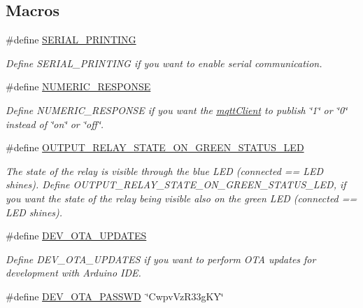 \subsection*{Macros}
\begin{DoxyCompactItemize}
\item 
\#define \hyperlink{WIFIOnOff_8ino_a111429b8fcdec5c5148837425261c18f}{S\-E\-R\-I\-A\-L\-\_\-\-P\-R\-I\-N\-T\-I\-N\-G}
\begin{DoxyCompactList}\small\item\em Define S\-E\-R\-I\-A\-L\-\_\-\-P\-R\-I\-N\-T\-I\-N\-G if you want to enable serial communication. \end{DoxyCompactList}\item 
\#define \hyperlink{WIFIOnOff_8ino_a59912dabf54ca43542cdc292e80d5742}{N\-U\-M\-E\-R\-I\-C\-\_\-\-R\-E\-S\-P\-O\-N\-S\-E}
\begin{DoxyCompactList}\small\item\em Define N\-U\-M\-E\-R\-I\-C\-\_\-\-R\-E\-S\-P\-O\-N\-S\-E if you want the \hyperlink{WIFIOnOff_8ino_a0524591f2a058a4f26f16579245db356}{mqtt\-Client} to publish \char`\"{}1\char`\"{} or \char`\"{}0\char`\"{} instead of \char`\"{}on\char`\"{} or \char`\"{}off\char`\"{}. \end{DoxyCompactList}\item 
\#define \hyperlink{WIFIOnOff_8ino_a05aa5fbe8a67eecb3e1d318cc590b4f9}{O\-U\-T\-P\-U\-T\-\_\-\-R\-E\-L\-A\-Y\-\_\-\-S\-T\-A\-T\-E\-\_\-\-O\-N\-\_\-\-G\-R\-E\-E\-N\-\_\-\-S\-T\-A\-T\-U\-S\-\_\-\-L\-E\-D}
\begin{DoxyCompactList}\small\item\em The state of the relay is visible through the blue L\-E\-D (connected == L\-E\-D shines). Define O\-U\-T\-P\-U\-T\-\_\-\-R\-E\-L\-A\-Y\-\_\-\-S\-T\-A\-T\-E\-\_\-\-O\-N\-\_\-\-G\-R\-E\-E\-N\-\_\-\-S\-T\-A\-T\-U\-S\-\_\-\-L\-E\-D, if you want the state of the relay being visible also on the green L\-E\-D (connected == L\-E\-D shines). \end{DoxyCompactList}\item 
\#define \hyperlink{WIFIOnOff_8ino_a29b6e2877e1ad309ad7f24c22f97eed1}{D\-E\-V\-\_\-\-O\-T\-A\-\_\-\-U\-P\-D\-A\-T\-E\-S}
\begin{DoxyCompactList}\small\item\em Define D\-E\-V\-\_\-\-O\-T\-A\-\_\-\-U\-P\-D\-A\-T\-E\-S if you want to perform O\-T\-A updates for development with Arduino I\-D\-E. \end{DoxyCompactList}\item 
\#define \hyperlink{WIFIOnOff_8ino_afc670eb8e8858f7ddbbecf997a99dbca}{D\-E\-V\-\_\-\-O\-T\-A\-\_\-\-P\-A\-S\-S\-W\-D}~\char`\"{}Cwpv\-Vz\-R33g\-K\-Y\char`\"{}

\end{DoxyCompactItemize}
